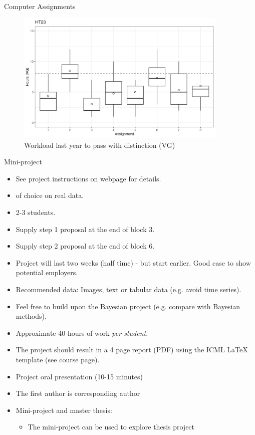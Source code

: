 \documentclass[10pt]{beamer}
\begin{document}
\begin{frame}{Computer Assignments}

\begin{figure}[h]
\caption{Workload last year to pass with distinction (VG)}
\centering
\includegraphics[width=0.9\textwidth]{figs/VG.png}
\end{figure}

\end{frame}


\begin{frame}{Mini-project}

\begin{itemize}
\item See project instructions on webpage for details.\pause
\item {} of choice on real data.
\item 2-3 students.\pause
\item Supply step 1 proposal at the end of block 3.\pause
\item Supply step 2 proposal at the end of block 6.\pause
\item Project will last two weeks (half time) - but start earlier. Good case to show potential employers.
\item Recommended data: Images, text or tabular data (e.g. avoid time series).
\item Feel free to build upon the Bayesian project (e.g. compare with Bayesian methods).
\item Approximate 40 hours of work \emph{per student}.\pause
\item The project should result in a 4 page report (PDF) using the ICML LaTeX template (see course page).
\item Project oral presentation (10-15 minutes)\pause
\item The first author is corresponding author\pause
\item Mini-project and master thesis:
\begin{itemize}
\item The mini-project can be used to explore thesis project
\end{itemize}
\end{itemize}
\end{frame}
\end{document}
